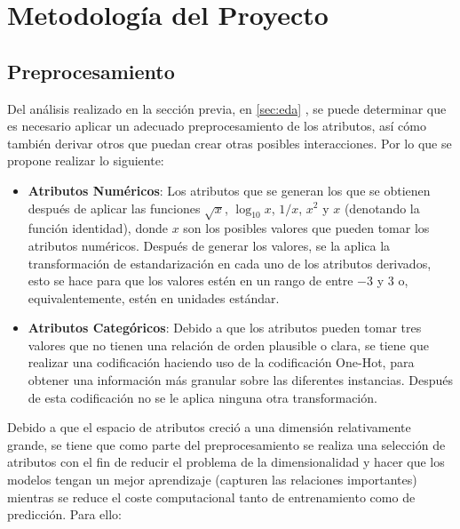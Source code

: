 \documentclass[12pt,a4paper]{article}
\begin{document}
    \section{Metodología del Proyecto}
    {
        \subsection{Preprocesamiento}
        {
            Del análisis realizado en la sección previa, en \ref{sec:eda} , se 
            puede determinar que es necesario aplicar un adecuado preprocesamiento 
            de los atributos, así cómo también derivar otros que puedan crear otras 
            posibles interacciones. Por lo que se propone realizar lo siguiente:

            \begin{itemize}
                \item \textbf{Atributos Numéricos}: Los atributos que se generan los 
                que se obtienen después de aplicar las funciones $\sqrt{x}$, $\log_{10}{x}$, 
                $1/x$, $x^2$ y $x$ (denotando la función identidad), donde $x$ son los posibles 
                valores que pueden tomar los atributos numéricos. Después de generar los valores, 
                se la aplica la transformación de estandarización en cada uno de los atributos 
                derivados, esto se hace para que los valores estén en un rango de entre $-3$ y $3$ 
                o, equivalentemente, estén en unidades estándar.
                \item \textbf{Atributos Categóricos}: Debido a que los atributos pueden tomar 
                tres valores que no tienen una relación de orden plausible o clara, se tiene que 
                realizar una codificación haciendo uso de la codificación One-Hot, para obtener 
                una información más granular sobre las diferentes instancias. Después de esta 
                codificación no se le aplica ninguna otra transformación.
            \end{itemize}

            Debido a que el espacio de atributos creció a una dimensión relativamente grande, se 
            tiene que como parte del preprocesamiento se realiza una selección de atributos con 
            el fin de reducir el problema de la dimensionalidad y hacer que los modelos tengan un 
            mejor aprendizaje (capturen las relaciones importantes) mientras se reduce el coste 
            computacional tanto de entrenamiento como de predicción. Para ello: 

}}
\end{document}
